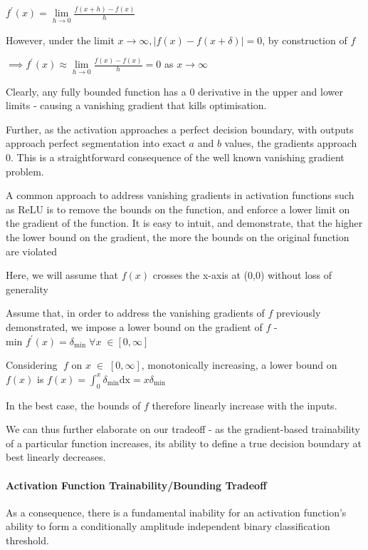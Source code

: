 \documentclass[9pt,conference]{IEEEtran}
\begin{document}
$f^\prime\left(x\right) = \lim\limits_{h\to 0}\frac{f\left(x+h\right)-f\left(x\right)}{h}$

However, under the limit $x \to \infty, \left|f\left(x\right)-f\left(x+\delta\right)\right|=0$, by construction of $f$

$\implies f^\prime\left(x\right) \approx \lim\limits_{h\to 0}\frac{f\left(x\right)-f\left(x\right)}{h} = 0$ as  $x\to \infty $

Clearly, any fully bounded function has a 0 derivative in the upper and lower limits - causing a vanishing gradient that kills optimisation.

Further, as the activation approaches a perfect decision boundary, with outputs approach perfect segmentation into exact $a$ and $b$ values, the gradients approach 0. This is a straightforward consequence of the well known vanishing gradient problem.

A common approach to address vanishing gradients in activation functions such as ReLU is to remove the bounds on the function, and enforce a lower limit on the gradient of the function. It is easy to intuit, and demonstrate, that the higher the lower bound on the gradient, the more the bounds on the original function are violated

Here, we will assume that $f\left(x\right)$ crosses the x-axis at (0,0) without loss of generality

Assume that, in order to address the vanishing gradients of $f$ previously demonstrated, we impose a lower bound on the gradient of $f$ - $\text{min } f^\prime\left(x\right)=\delta_\text{min} \; \forall x\; \in\left[0,\infty\right]$

Considering  $\;f$ on $x\;\in\;\left[0,\infty\right]$, monotonically increasing, a lower bound on $f\left(x\right)$ is $f\left(x\right)=\int_0^x\delta_{\text{min}}\text{dx}=x\delta_{\text{min}}$

In the best case, the bounds of $f$ therefore linearly increase with the inputs.

We can thus further elaborate on our tradeoff - as the gradient-based trainability of a particular function increases, its ability to define a true decision boundary at best linearly decreases.

\paragraph{Activation Function Trainability/Bounding Tradeoff}
As a consequence, there is a fundamental inability for an activation function's ability to form a conditionally amplitude independent binary classification threshold.
\end{document}
